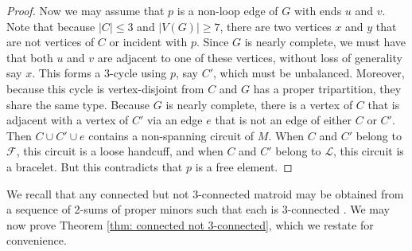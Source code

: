 \documentclass[12pt]{article}
\theoremstyle{definition}
\theoremstyle{plain} %
\newcommand{\cF}{\mathcal{F}}
\newcommand{\cL}{\mathcal{L}}
\begin{document}
\begin{proof}
    Now we may assume that $p$ is a non-loop edge of $G$ with ends $u$ and $v$. Note that because $\lvert C\rvert\leq3$ and $\lvert V(G)\rvert\geq7$, there are two vertices $x$ and $y$ that are not vertices of $C$ or incident with $p$. Since $G$ is nearly complete, we must have that both $u$ and $v$ are adjacent to one of these vertices, without loss of generality say $x$. This forms a 3-cycle using $p$, say $C'$, which must be unbalanced. Moreover, because this cycle is vertex-disjoint from $C$ and $G$ has a proper tripartition, they share the same type. Because $G$ is nearly complete, there is a vertex of $C$ that is adjacent with a vertex of $C'$ via an edge $e$ that is not an edge of either $C$ or $C'$. Then $C\cup C'\cup e$ contains a non-spanning circuit of $M$. When $C$ and $C'$ belong to $\cF$, this circuit is a loose handcuff, and when $C$ and $C'$ belong to $\cL$, this circuit is a bracelet. But this contradicts that $p$ is a free element.
    \end{proof}


We recall that any connected but not 3-connected matroid may be obtained from a sequence of 2-sums of proper minors such that each is 3-connected \cite[Corollary 8.3.4]{Oxley2011}. We may now prove Theorem \ref{thm: connected not 3-connected}, which we restate for convenience.
\end{document}
